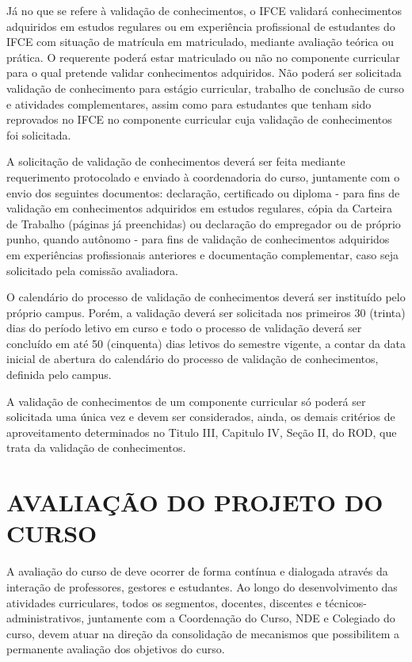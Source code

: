 \documentclass{paper}
\begin{document}
Já no que se refere à validação de conhecimentos, o IFCE validará conhecimentos adquiridos em estudos regulares ou em experiência profissional de estudantes do IFCE com situação de matrícula em matriculado, mediante avaliação teórica ou prática. O requerente poderá estar matriculado ou não no componente curricular para o qual pretende validar conhecimentos adquiridos. 
Não poderá ser solicitada validação de conhecimento para estágio curricular, trabalho de conclusão de curso e atividades complementares, assim como para estudantes que tenham sido reprovados no IFCE no componente curricular cuja validação de conhecimentos foi solicitada.

A solicitação de validação de conhecimentos deverá ser feita mediante requerimento protocolado e enviado à coordenadoria do curso, juntamente com o envio dos seguintes documentos: declaração, certificado ou diploma - para fins de validação em conhecimentos adquiridos em estudos regulares, cópia da Carteira de Trabalho (páginas já preenchidas) ou declaração do empregador ou de próprio punho, quando autônomo - para fins de validação de conhecimentos adquiridos em experiências profissionais anteriores e documentação complementar, caso seja solicitado pela comissão avaliadora.

O calendário do processo de validação de conhecimentos deverá ser instituído pelo próprio campus. Porém, a validação deverá ser solicitada nos primeiros 30 (trinta) dias do período letivo em curso e todo o processo de validação deverá ser concluído em até 50 (cinquenta) dias letivos do semestre vigente, a contar da data inicial de abertura do calendário do processo de validação de conhecimentos, definida pelo campus. 

A validação de conhecimentos de um componente curricular só poderá ser solicitada uma única vez e devem ser considerados, ainda, os demais critérios de aproveitamento determinados no Titulo III, Capitulo IV, Seção II, do ROD, que trata da validação de conhecimentos.


\clearpage
\section{AVALIAÇÃO DO PROJETO DO CURSO}

A avaliação do curso de \NOMECURSO deve ocorrer de forma contínua e dialogada através da interação de professores, gestores e estudantes. Ao longo do desenvolvimento das atividades curriculares, todos os segmentos, docentes, discentes e técnicos-administrativos, juntamente com a Coordenação do Curso, NDE e Colegiado do curso, devem atuar na direção da consolidação de mecanismos que possibilitem a permanente avaliação dos objetivos do curso.
\end{document}
